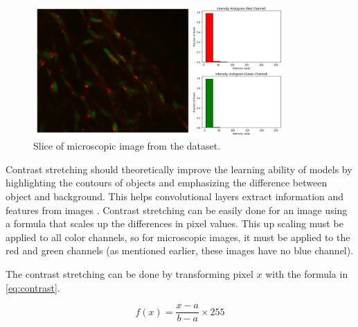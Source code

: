 \begin{figure}[!htb]
  \centering
  \includegraphics[width=0.85\textwidth]{Images/img.jpg}
  \caption[Slice of microscopic image from the dataset.]{Slice of microscopic image from the dataset.}
  \label{fig:micro}
\end{figure}



Contrast stretching should theoretically improve the learning ability of models by highlighting the contours of objects and emphasizing the difference between object and background. This helps convolutional layers extract information and features from images \cite{contrast_strect}. Contrast stretching can be easily done for an image using a formula that scales up the differences in pixel values. This up scaling must be applied to all color channels, so for microscopic images, it must be applied to the red and green channels (as mentioned earlier, these images have no blue channel).

The contrast stretching can be done by transforming pixel $x$ with the formula in \ref{eq:contrast}.

\begin{equation}
    \label{eq:contrast}
    f(x) = \frac{x-a}{b-a} \times 255
\end{equation}

